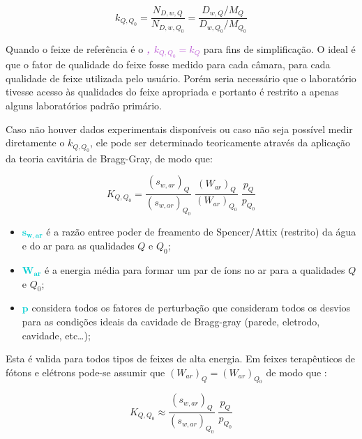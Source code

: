 \documentclass[11pt,a4paper]{article}
\newcounter{exemplo}
\begin{document}
			\begin{equation}
				k_{Q,Q_0} = \frac{N_{D,w,Q}}{N_{D,w,Q_0}} = \frac{D_{w,Q}/M_Q}{D_{w,Q_0}/M_{Q_0}}
			\end{equation}

		Quando o feixe de referência é o \textcolor{MediumOrchid}{\textit{\textbf{, $k_{Q,Q_0} = k_Q$}}} para fins de simplificação. O ideal é que o fator de qualidade do feixe fosse medido para cada câmara, para cada qualidade de feixe utilizada pelo usuário. Porém seria necessário que o laboratório tivesse acesso às qualidades do feixe apropriada e portanto é restrito a apenas alguns laboratórios padrão primário.

		Caso não houver dados experimentais disponíveis ou caso não seja possível medir diretamente o $k_{Q,Q_0}$, ele pode ser determinado teoricamente através da aplicação da teoria cavitária de Bragg-Gray, de modo que:

			\begin{equation}
				K_{Q,Q_0} = \frac{(s_{w,ar})_Q}{(s_{w,ar})_{Q_0}} \; \frac{(W_{ar})_{Q}}{(W_{ar})_{Q_0}} \; \frac{p_{Q}}{p_{Q_0}}
				\label{eq:kqqBraggGray}
			\end{equation}

			\begin{exemplo}[onde:]
				\begin{itemize}[label=\textcolor{CarnationPink}{$\star$}]
					\item \textbf{\textcolor{DarkTurquoise}{$\mathbf{s_{w,ar}}$}} é a razão entree poder de freamento de Spencer/Attix (restrito) da água e do ar para as qualidades $Q$ e $Q_0$;
					\item  \textbf{\textcolor{DarkTurquoise}{$\mathbf{W_{ar}}$}} é a energia média para formar um par de íons no ar para a qualidades $Q$ e $Q_0$;
					\item \textbf{\textcolor{DarkTurquoise}{$\mathbf{p}$}} considera todos os fatores de perturbação que consideram todos os desvios para as condições ideais da cavidade de Bragg-gray (parede, eletrodo, cavidade, etc\dots);
				\end{itemize}
			\end{exemplo}

		Esta  é valida para todos tipos de feixes de alta energia. Em feixes terapêuticos de fótons e elétrons pode-se assumir que $(W_{ar})_{Q} = (W_{ar})_{Q_0}$ de modo que :
		
			\begin{equation}
				K_{Q,Q_0} \approx  \frac{(s_{w,ar})_Q}{(s_{w,ar})_{Q_0}} \; \frac{p_{Q}}{p_{Q_0}}
				\label{eq:kqqAproximacao}
			\end{equation}
\end{document}
